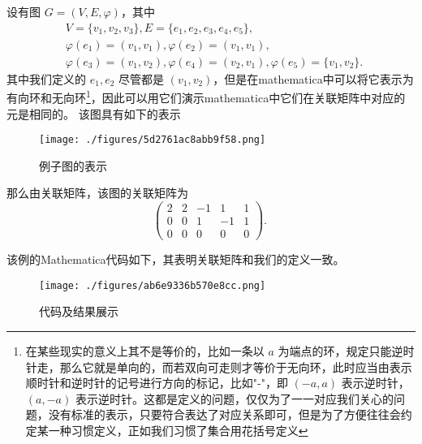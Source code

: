 \begin{example}{}
设有图 $G=(V,E,\varphi)$，其中
 \begin{equation}
 \begin{aligned}
  &V=\{v_1,v_2,v_3\},E=\{e_1,e_2,e_3,e_4,e_5\},\\
 &\varphi(e_1)=(v_1,v_1), \varphi(e_2)=(v_1,v_1), \\
 &\varphi(e_3)=(v_1,v_2), \varphi(e_4)=(v_2,v_1),\varphi(e_5)=\{v_1,v_2\}.
 \end{aligned}~
 \end{equation}
 其中我们定义的 $e_1,e_2$ 尽管都是 $(v_1,v_2)$，但是在mathematica中可以将它表示为有向环和无向环\footnote{在某些现实的意义上其不是等价的，比如一条以 $a$ 为端点的环，规定只能逆时针走，那么它就是单向的，而若双向可走则才等价于无向环，此时应当由表示顺时针和逆时针的记号进行方向的标记，比如"-"，即 $(-a,a)$ 表示逆时针，$(a,-a)$ 表示逆时针。这都是定义的问题，仅仅为了一一对应我们关心的问题，没有标准的表示，只要符合表达了对应关系即可，但是为了方便往往会约定某一种习惯定义，正如我们习惯了集合用花括号定义}，因此可以用它们演示mathematica中它们在关联矩阵中对应的元是相同的。
 该图具有如下的表示
\begin{figure}[ht]
\centering
\texttt{[image: ./figures/5d2761ac8abb9f58.png]}
\caption{例子图的表示} \label{fig_RepGra_2}
\end{figure} 
那么由关联矩阵，该图的关联矩阵为
\begin{equation}
\begin{pmatrix}
2&2&-1&1&1\\
0&0&1&-1&1\\
0&0&0&0&0
\end{pmatrix}.~
\end{equation}

该例的Mathematica代码如下，其表明关联矩阵和我们的定义一致。
\begin{figure}[ht]
\centering
\texttt{[image: ./figures/ab6e9336b570e8cc.png]}
\caption{代码及结果展示} \label{fig_RepGra_1}
\end{figure}

\end{example}

